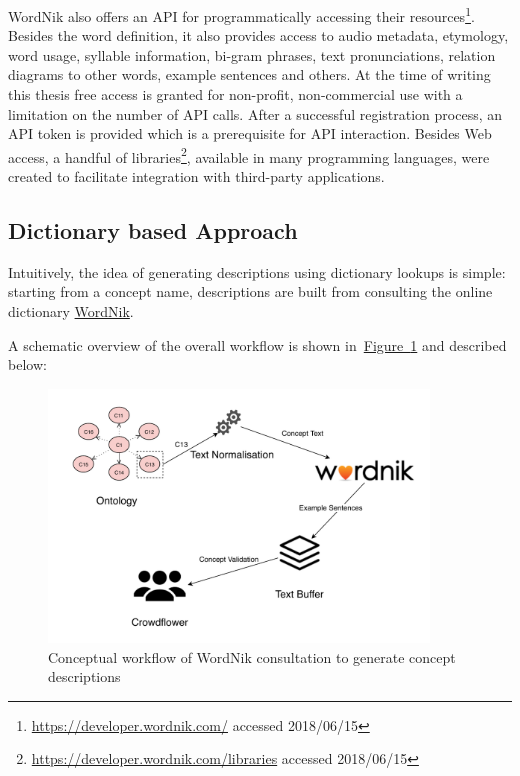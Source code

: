 WordNik also offers an API for programmatically accessing their resources\footnote{\url{https://developer.wordnik.com/} accessed 2018/06/15}. Besides the word definition, it also provides access to audio metadata, etymology, word usage, syllable information, bi-gram phrases, text pronunciations, relation diagrams to other words, example sentences and others. At the time of writing this thesis free access is granted for non-profit, non-commercial use with a limitation on the number of API calls. 
After a successful registration process, an API token is provided which is a prerequisite for API interaction. Besides Web access, a handful of libraries\footnote{\url{https://developer.wordnik.com/libraries} accessed 2018/06/15}, available in many programming languages, were created to facilitate integration with third-party applications. 

\subsection{Dictionary based Approach}\label{sec:enrichment_dictionary_approach}
Intuitively, the idea of generating descriptions using dictionary lookups is simple: starting from a concept name, descriptions are built from consulting the online dictionary \hyperref[sec:wordnik]{WordNik}. 

A schematic overview of the overall workflow is shown in~\hyperref[fig:external_source_workflow]{Figure~\ref*{fig:external_source_workflow}} and described below:
\begin{figure}
	 \centering
	 \includegraphics[width=0.9\textwidth]{drawio/External_Source_Workflow}
	 \caption{Conceptual workflow of WordNik consultation to generate concept descriptions}\label{fig:external_source_workflow}
\end{figure}

